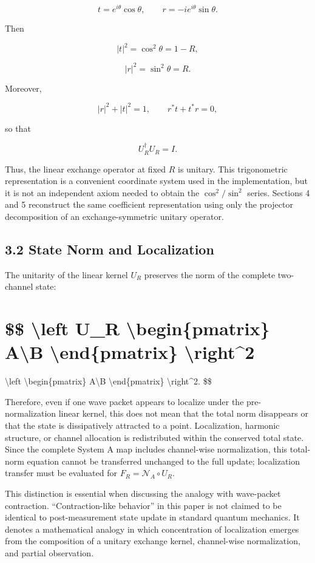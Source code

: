 \documentclass[
  a4paper,
  10pt]{article}
\begin{document}
\[
t=e^{i\theta}\cos\theta,
\qquad
r=-ie^{i\theta}\sin\theta.
\]

Then

\[
|t|^2=\cos^2\theta=1-R,
\]

\[
|r|^2=\sin^2\theta=R.
\]

Moreover,

\[
|r|^2+|t|^2=1,
\qquad
r^*t+t^*r=0,
\]

so that

\[
U_R^\dagger U_R=I.
\]

Thus, the linear exchange operator at fixed \(R\) is unitary. This
trigonometric representation is a convenient coordinate system used in
the implementation, but it is not an independent axiom needed to obtain
the \(\cos^2/\sin^2\) series. Sections 4 and 5 reconstruct the same
coefficient representation using only the projector decomposition of an
exchange-symmetric unitary operator.

\subsection{3.2 State Norm and
Localization}\label{32-state-norm-and-localization}

The unitarity of the linear kernel \(U_R\) preserves the norm of the
complete two-channel state:

\section{\$\$ \textbackslash left\textbar{} U\_R
\textbackslash begin\{pmatrix\} A\textbackslash B
\textbackslash end\{pmatrix\}
\textbackslash right\textbar\^{}2}\label{-left-u_r-beginpmatrix-ab-endpmatrix-right2}

\textbackslash left\textbar{} \textbackslash begin\{pmatrix\}
A\textbackslash B \textbackslash end\{pmatrix\}
\textbackslash right\textbar\^{}2. \$\$

Therefore, even if one wave packet appears to localize under the
pre-normalization linear kernel, this does not mean that the total norm
disappears or that the state is dissipatively attracted to a point.
Localization, harmonic structure, or channel allocation is redistributed
within the conserved total state. Since the complete System A map
includes channel-wise normalization, this total-norm equation cannot be
transferred unchanged to the full update; localization transfer must be
evaluated for \(F_R=\mathcal N_A\circ U_R\).

This distinction is essential when discussing the analogy with
wave-packet contraction. ``Contraction-like behavior'' in this paper is
not claimed to be identical to post-measurement state update in standard
quantum mechanics. It denotes a mathematical analogy in which
concentration of localization emerges from the composition of a unitary
exchange kernel, channel-wise normalization, and partial observation.
\end{document}
